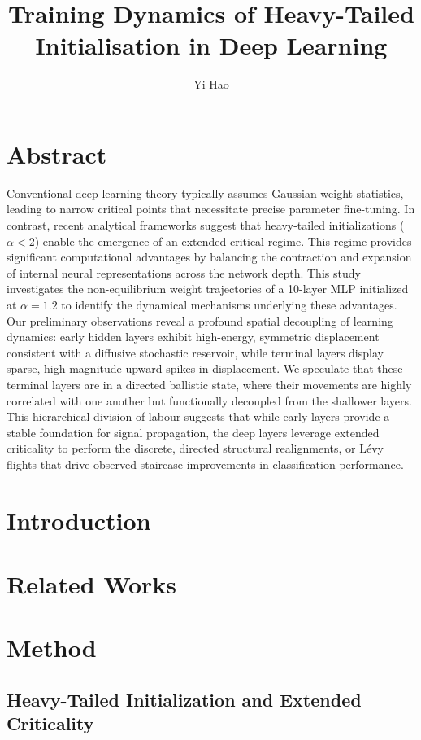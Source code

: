 \documentclass[11pt,a4paper]{article}
\author{Yi Hao}
\title{Training Dynamics of Heavy-Tailed Initialisation in Deep Learning}
\begin{document}
\maketitle
\section{Abstract}
Conventional deep learning theory typically assumes Gaussian weight statistics, leading to narrow critical points that necessitate precise parameter fine-tuning. In contrast, recent analytical frameworks suggest that heavy-tailed initializations ($\alpha < 2$) enable the emergence of an extended critical regime. This regime provides significant computational advantages by balancing the contraction and expansion of internal neural representations across the network depth. This study investigates the non-equilibrium weight trajectories of a 10-layer MLP initialized at $\alpha = 1.2$ to identify the dynamical mechanisms underlying these advantages. Our preliminary observations reveal a profound spatial decoupling of learning dynamics: early hidden layers exhibit high-energy, symmetric displacement consistent with a diffusive stochastic reservoir, while terminal layers display sparse, high-magnitude upward spikes in displacement. We speculate that these terminal layers are in a directed ballistic state, where their movements are highly correlated with one another but functionally decoupled from the shallower layers. This hierarchical division of labour suggests that while early layers provide a stable foundation for signal propagation, the deep layers leverage extended criticality to perform the discrete, directed structural realignments, or Lévy flights that drive observed staircase improvements in classification performance.
\section{Introduction}
\section{Related Works}
\section{Method}
\subsection{Heavy-Tailed Initialization and Extended Criticality}
\end{document}
